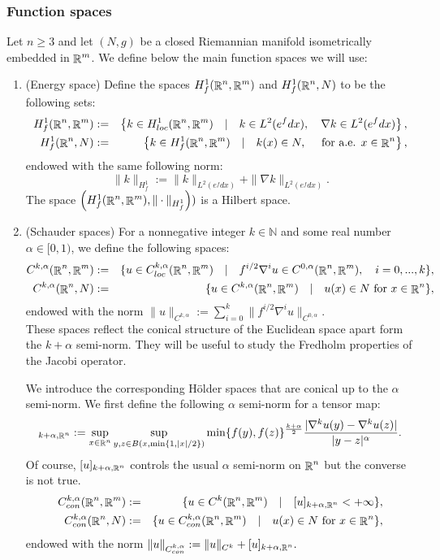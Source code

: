 \documentclass[a4paper,11pt,reqno]{amsart}
\def\R{\mathop{\rm \mathbb{R}}\nolimits}
\begin{document}
\subsubsection{Function spaces}
Let $n\geq 3$ and let $(N,g)$ be a closed Riemannian manifold isometrically embedded in $\R^m$. We define below the main function spaces we will use:
\begin{enumerate}
\item (Energy space) Define the spaces $H^1_f(\R^n,\R^m)$ and $H^1_f(\R^n,N)$ to be the following sets:
\begin{eqnarray*}
H^1_f(\R^n,\R^m)&:=&\left\{k\in H^1_{loc}(\R^n,\R^m)\quad|\quad k\in L^2(e^fdx),\quad \nabla k \in L^2(e^fdx)\right\},\\
H^1_f(\R^n,N)&:=&\left\{k\in H^1_{f}(\R^n,\R^m)\quad|\quad k(x)\in N,\quad \text{ for a.e. $x\in\R^n$}\right\},
\end{eqnarray*}
endowed with the same following norm: $$\|k\|_{H^1_f}:=\|k\|_{L^2(e^fdx)}+\|\nabla k\|_{L^2(e^fdx)}.$$
The space $\left(H^1_f(\R^n,\R^m), \|\cdot\|_{H^1_f}\right))$ is a Hilbert space.
\item (Schauder spaces)
For a nonnegative integer $k\in\mathbb{N}$ and some real number $\alpha\in[0,1)$, we define the following spaces:
\begin{eqnarray*}
C^{k,\alpha}(\R^n,\R^m)&:=&\{u\in C^{k,\alpha}_{loc}(\R^n,\R^m)\quad|\quad f^{i/2}\nabla^iu\in C^{0,\alpha}(\R^n,\R^m),\quad i=0,..., k\},\\
C^{k,\alpha}(\R^n,N)&:=&\{u\in C^{k,\alpha}(\R^n,\R^m)\quad|\quad \text{$u(x)\in N$ for $x\in \R^n$}\},
\end{eqnarray*}
endowed with the norm $\|u\|_{C^{k,\alpha}}:=\sum_{i=0}^k\|f^{i/2}\nabla^iu\|_{C^{0,\alpha}}.$\\

These spaces reflect the conical structure of the Euclidean space apart form the $k+\alpha$ semi-norm. They will be useful to study the Fredholm properties of the Jacobi operator.

We introduce the corresponding H\" older spaces that are conical up to the $\alpha$ semi-norm. We first define the following $\alpha$ semi-norm for a tensor map:
\begin{eqnarray*}
[u]_{k+\alpha,\R^n}:=\sup_{x\in\R^n}\sup_{y,z\in B(x,\min\{1,|x|/2\})}\min\{f(y),f(z)\}^{\frac{k+\alpha}{2}}\frac{|\nabla^ku(y)-\nabla^ku(z)|}{|y-z|^{\alpha}}.
\end{eqnarray*}
Of course, $[u]_{k+\alpha,\R^n}$ controls the usual $\alpha$ semi-norm on $\R^n$ but the converse is not true.
\begin{eqnarray*}
C^{k,\alpha}_{con}(\R^n,\R^m)&:=&\{u\in C^{k}(\R^n,\R^m)\quad|\quad [u]_{k+\alpha,\R^n}<+\infty\},\\
C^{k,\alpha}_{con}(\R^n,N)&:=&\{u\in C_{con}^{k,\alpha}(\R^n,\R^m)\quad|\quad \text{$u(x)\in N$ for $x\in \R^n$}\},
\end{eqnarray*}
endowed with the norm $\|u\|_{C^{k,\alpha}_{con}}:=\|u\|_{C^k}+[u]_{k+\alpha,\R^n}.$\\


\end{enumerate}
\end{document}
